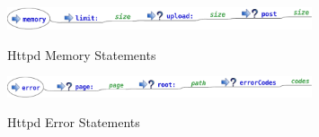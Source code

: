 \begin{figure}[htp]
\centering
\includegraphics[width=0.8\textwidth]{httpd_memory_script}
\label{fig:httpd_memory_script}
\caption{Httpd Memory Statements}
\end{figure}

\begin{figure}[htp]
\centering
\includegraphics[width=0.8\textwidth]{httpd_error_script}
\label{fig:httpd_error_script}
\caption{Httpd Error Statements}
\end{figure}

